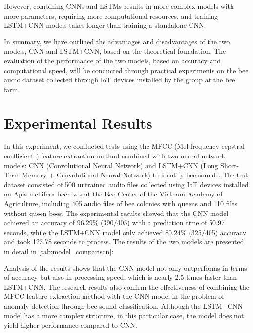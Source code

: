 \documentclass[twocolumn]{article}
\begin{document}
However, combining CNNs and LSTMs results in more complex models with more parameters,
requiring more computational resources, and training LSTM+CNN models takes longer than
training a standalone CNN.

In summary, we have outlined the advantages and disadvantages of the two models, CNN and
LSTM+CNN, based on the theoretical foundation. The evaluation of the performance of the
two models, based on accuracy and computational speed, will be conducted through practical
experiments on the bee audio dataset collected through IoT devices installed by the group
at the bee farm.

\section{Experimental Results}
In this experiment, we conducted tests using the MFCC (Mel-frequency cepstral coefficients)
feature extraction method combined with two neural network models: CNN (Convolutional Neural
Network) and LSTM+CNN (Long Short-Term Memory + Convolutional Neural Network) to identify
bee sounds. The test dataset consisted of 500 untrained audio files collected using IoT
devices installed on Apis mellifera beehives at the Bee Center of the Vietnam Academy of
Agriculture, including 405 audio files of bee colonies with queens and 110 files without
queen bees. The experimental results showed that the CNN model achieved an accuracy of
96.29\% (390/405) with a prediction time of 50.97 seconds, while the LSTM+CNN model only
achieved 80.24\% (325/405) accuracy and took 123.78 seconds to process. The results of the
two models are presented in detail in \autoref{tab:model_comparison}:

\begin{table}[H]
  \centering
  \caption{Comparison of accuracy and processing time between models}
  \label{tab:model_comparison}
\end{table}

Analysis of the results shows that the CNN model not only outperforms in terms of accuracy
but also in processing speed, which is nearly 2.5 times faster than LSTM+CNN. The research
results also confirm the effectiveness of combining the MFCC feature extraction method with
the CNN model in the problem of anomaly detection through bee sound classification.
Although the LSTM+CNN model has a more complex structure, in this particular case, the
model does not yield higher performance compared to CNN.
\end{document}
